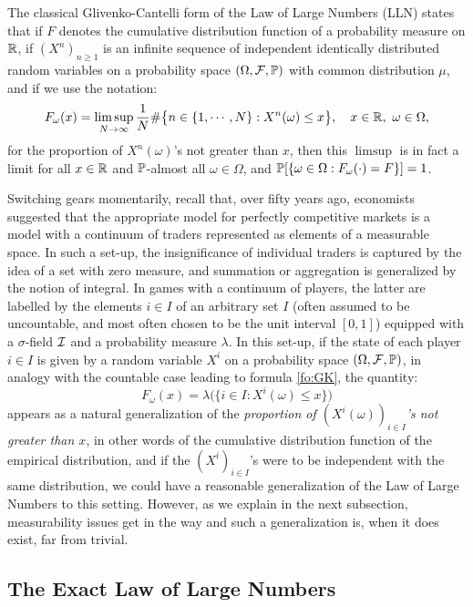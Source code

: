 \vskip 4pt
The classical Glivenko-Cantelli form of the Law of Large Numbers (LLN) states that if $F$ denotes the cumulative distribution function of a probability measure on $\mathbb{R}$, if $(X^n)_{n\ge 1}$ is an infinite sequence of independent identically distributed random variables on a probability space $(\Omega,{\cal F},\mathbb{P})$ with common distribution $\mu$, 
and if we use the notation: 
\begin{equation}
\label{fo:GK}
F_\omega(x)=\limsup_{N\to\infty}\frac1N\#\bigl\{n \in \{1,\cdots,N\}  :  X^n(\omega)\le x\bigr\}, \quad x \in \mathbb{R}, \ \omega \in \Omega,
\end{equation}
for the proportion of $X^n(\omega)$'s not greater than $x$, then this $\limsup$ is in fact a limit for all $x\in\mathbb{R}$ and $\mathbb{P}$-almost all $\omega\in\Omega$, and 
$\mathbb{P}[\{\omega\in\Omega  :  F_\omega(\cdot)=F\}]=1$.

\vskip 2pt
Switching gears momentarily, recall that,
over fifty years ago, economists suggested that the appropriate model for perfectly competitive markets is a model with a continuum of traders represented as elements of a measurable space. In such a set-up, the insignificance of individual traders is captured by the idea of a set with zero measure, and summation or aggregation is generalized by the notion of integral. In games with a continuum of players, the latter are labelled by the elements $i\in I$ of an arbitrary set $I$ (often assumed to be uncountable, and most often chosen to be the unit interval $[0,1]$) equipped with a $\sigma$-field ${\cal I}$ and a probability measure $\lambda$. In this set-up, if the state of each player $i\in I$ is given by a random variable $X^i$ on a probability space $(\Omega,{\cal F},\mathbb{P})$, in analogy with the countable case leading to formula \eqref{fo:GK}, the quantity:
\begin{equation}
\label{fo:empirical}
F_\omega(x)=\lambda\bigl(\{i\in I : X^i(\omega)\le x\}\bigr)
\end{equation} 
appears as a natural generalization of the \emph{proportion of $(X^i(\omega))_{i \in I}$'s not greater than $x$}, in other words of the cumulative distribution function of the empirical distribution, and if the 
$(X^i)_{i \in I}$'s were to be independent with the same distribution, we could have a reasonable generalization of the Law of Large Numbers to this setting. However, as we explain in the next subsection, measurability issues get in the way and such a generalization is, when it does exist, far from trivial.

\subsection[The Exact Law of Large Numbers]{\textbf{The Exact Law of Large Numbers}}

